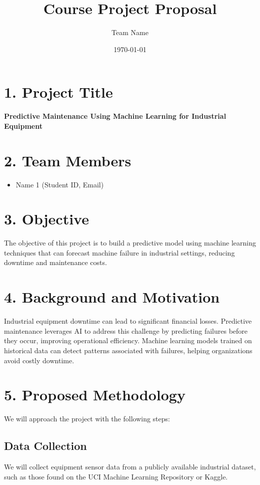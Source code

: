 \documentclass{article}
\title{Course Project Proposal}
\author{Team Name}
\date{\today}
\begin{document}
\maketitle

\section*{1. Project Title}
\textbf{Predictive Maintenance Using Machine Learning for Industrial Equipment}

\section*{2. Team Members}
\begin{itemize}
    \item Name 1 (Student ID, Email)

\end{itemize}

\section*{3. Objective}
The objective of this project is to build a predictive model using machine learning techniques that can forecast machine failure in industrial settings, reducing downtime and maintenance costs.

\section*{4. Background and Motivation}
Industrial equipment downtime can lead to significant financial losses. Predictive maintenance leverages AI to address this challenge by predicting failures before they occur, improving operational efficiency. Machine learning models trained on historical data can detect patterns associated with failures, helping organizations avoid costly downtime.

\section*{5. Proposed Methodology}
We will approach the project with the following steps:

\subsection*{Data Collection}
We will collect equipment sensor data from a publicly available industrial dataset, such as those found on the UCI Machine Learning Repository or Kaggle.
\end{document}

